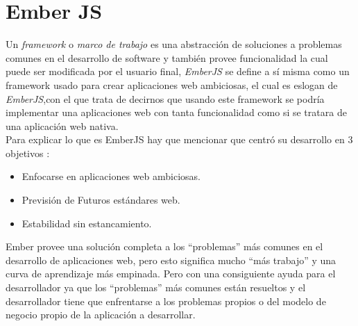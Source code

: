 \section{Ember JS}
\label{sec:ember_js}


Un \emph{framework} o \emph{marco de trabajo} es una abstracción de soluciones a problemas comunes en el desarrollo de software y también provee funcionalidad la cual puede ser modificada por el usuario final, \emph{EmberJS} se define a sí misma como un framework usado para crear aplicaciones web ambiciosas, el cual es eslogan de \emph{EmberJS},con el que trata de decirnos que usando este framework se podría implementar una aplicaciones web con tanta funcionalidad como si se tratara de una aplicación web nativa.\\

Para explicar lo que es EmberJS hay que mencionar que centró su desarrollo en 3 objetivos \cite{ember_antidote}:

\begin{itemize}
  \item Enfocarse en aplicaciones web ambiciosas. %
  \item Previsión de Futuros estándares web. %
  \item Estabilidad sin estancamiento. %
\end{itemize}

Ember provee una solución completa a los ``problemas'' más comunes en el desarrollo de aplicaciones web, pero esto significa mucho ``más trabajo'' y una curva de aprendizaje más empinada. Pero con una consiguiente ayuda para el desarrollador ya que los ``problemas'' más comunes están resueltos y el desarrollador tiene que enfrentarse a los problemas propios o del modelo de negocio propio de la aplicación a desarrollar.\\

